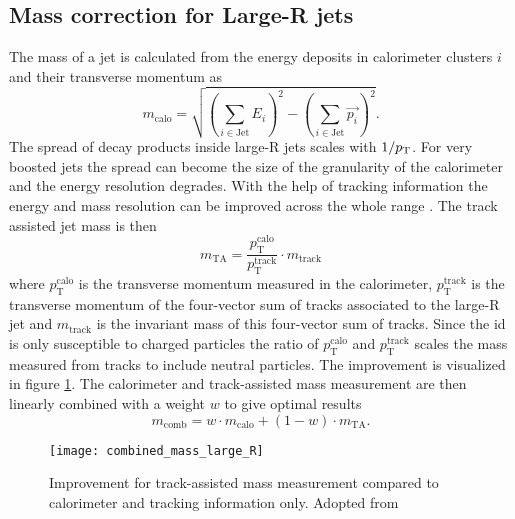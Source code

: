\subsection{Mass correction for Large-R jets}
The mass of a jet is calculated from the energy deposits in calorimeter clusters $i$ and their transverse momentum as
\begin{equation}
  m_{\text{calo}} = \sqrt{\left(\sum_{i\in \text{Jet}}E_i\right)^2-\left(\sum_{i\in \text{Jet}}\vec{p_i}\right)^2}.
\end{equation}
The spread of decay products inside large-R jets scales with $1/p_{\text{T}}$. For very boosted jets the spread can become the size of the granularity of the calorimeter and the energy resolution degrades. With the help of tracking information the energy and mass resolution can be improved across the whole \pt range \citep{Aaboud:2019aa}. The track assisted jet mass is then
\begin{equation}
  m_{\text{TA}} = \frac{p_{\text{T}}^{\text{calo}}}{p_{\text{T}}^{\text{track}}} \cdot m_{\text{track}}
\end{equation}
where $p_{\text{T}}^{\text{calo}}$ is the transverse momentum measured in the calorimeter, $p_{\text{T}}^{\text{track}}$ is the transverse momentum of the four-vector sum of tracks associated to the large-R jet and $m_\text{track}$ is the invariant mass of this four-vector sum of tracks. Since the \ac{id} is only susceptible to charged particles the ratio of $p_{\text{T}}^{\text{calo}}$ and $p_{\text{T}}^{\text{track}}$ scales the mass measured from tracks to include neutral particles. The improvement is visualized in figure \ref{fig:combined_mass_large_R}. The calorimeter and track-assisted mass measurement are then linearly combined with a weight $w$ to give optimal results
\begin{equation}
  m_{\text{comb}} =  w\cdot m_{\text{calo}}+(1-w)\cdot m_{\text{TA}}.
\end{equation}
\begin{figure}
  \centering
  \texttt{[image: combined\_mass\_large\_R]}
  \caption[]{Improvement for track-assisted mass measurement compared to calorimeter and tracking information only. Adopted from \citep{ATLAS-CONF-2016-035} }
  \label{fig:combined_mass_large_R}
\end{figure}
